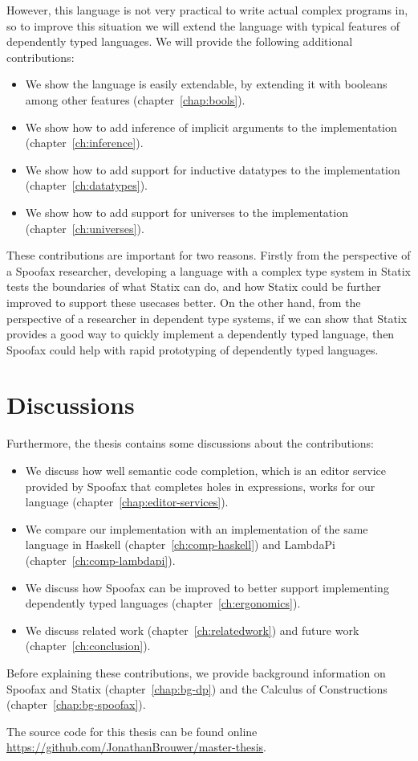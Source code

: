 However, this language is not very practical to write actual complex programs in, so to improve this situation we will extend the language with typical features of dependently typed languages. We will provide the following additional contributions:
\begin{itemize}
	\item We show the language is easily extendable, by extending it with booleans among other features (chapter~\ref{chap:bools}).
	\item We show how to add inference of implicit arguments to the implementation (chapter~\ref{ch:inference}).
	\item We show how to add support for inductive datatypes to the implementation (chapter~\ref{ch:datatypes}).
	\item We show how to add support for universes to the implementation (chapter~\ref{ch:universes}).
\end{itemize}

These contributions are important for two reasons. Firstly from the perspective of a Spoofax researcher, developing a language with a complex type system in Statix tests the boundaries of what Statix can do, and how Statix could be further improved to support these usecases better. On the other hand, from the perspective of a researcher in dependent type systems, if we can show that Statix provides a good way to quickly implement a dependently typed language, then Spoofax could help with rapid prototyping of dependently typed languages.

\section*{Discussions}

Furthermore, the thesis contains some discussions about the contributions:
\begin{itemize}
	\item We discuss how well semantic code completion, which is an editor service provided by Spoofax that completes holes in expressions, works for our language (chapter~\ref{chap:editor-services}).
	\item We compare our implementation with an implementation of the same language in Haskell (chapter~\ref{ch:comp-haskell}) and LambdaPi (chapter~\ref{ch:comp-lambdapi}).
	\item We discuss how Spoofax can be improved to better support implementing dependently typed languages (chapter~\ref{ch:ergonomics}).
	\item We discuss related work (chapter~\ref{ch:relatedwork}) and future work (chapter~\ref{ch:conclusion}).
\end{itemize}

\noindent Before explaining these contributions, we provide background information on Spoofax and Statix (chapter~\ref{chap:bg-dp}) and the Calculus of Constructions (chapter~\ref{chap:bg-spoofax}).

The source code for this thesis can be found online \\ \url{https://github.com/JonathanBrouwer/master-thesis}.

